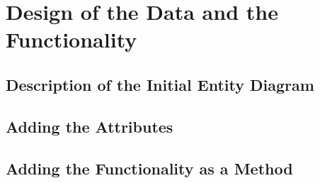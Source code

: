 \label{cha:design_of_data_and_functionality}

\section{Design of the Data and the Functionality}

\subsection{Description of the Initial Entity Diagram}

\subsection{Adding the Attributes}

\subsection{Adding the Functionality as a Method}
